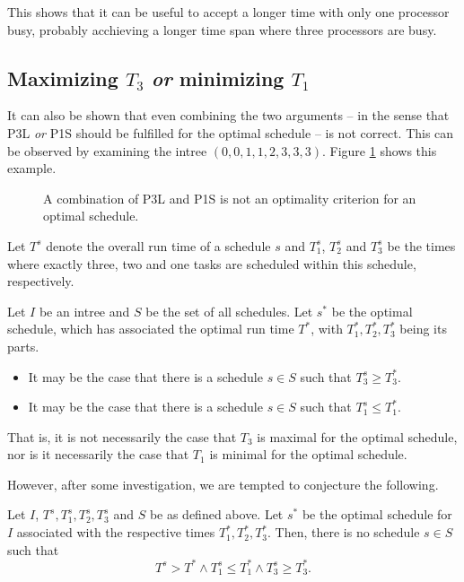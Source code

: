 This shows that it can be useful to accept a longer time with only one processor busy, probably acchieving a longer time span where three processors are busy.

\subsection{Maximizing $T_3$ \emph{or} minimizing $T_1$}
\label{sec:p3-suboptimality-maximizing-t3-and-minimizing-t1}

It can also be shown that even combining the two arguments -- in the sense that P3L \emph{or} P1S should be fulfilled for the optimal schedule -- is not correct. This can be observed by examining the intree $(0, 0, 1, 1, 2, 3, 3, 3)$. Figure \ref{fig:p3l-p1s-combo-suboptimal} shows this example.

\begin{figure}[ht]
  \centering
  
  \caption{A combination of P3L and P1S is not an optimality criterion for an optimal schedule.}
  \label{fig:p3l-p1s-combo-suboptimal}
\end{figure}

\begin{corollary}
  Let $T^s$ denote the overall run time of a schedule $s$ and $T_1^s$, $T_2^s$ and $T_3^s$ be the times where exactly three, two and one tasks are scheduled within this schedule, respectively.

  Let $I$ be an intree and $S$ be the set of all schedules. Let $s^*$ be the optimal schedule, which has associated the optimal run time $T^*$, with $T_1^*, T_2^*, T_3^*$ being its parts.
  \begin{itemize}
  \item It may be the case that there is a schedule $s\in S$ such that $T_3^s \geq T_3^*$.
  \item It may be the case that there is a schedule $s\in S$ such that $T_1^s \leq T_1^*$.
  \end{itemize}
\end{corollary}

That is, it is not necessarily the case that $T_3$ is maximal for the optimal schedule, nor is it necessarily the case that $T_1$ is minimal for the optimal schedule.

However, after some investigation, we are tempted to conjecture the following.

\begin{conjecture}
  Let $I$, $T^s, T_1^s, T_2^s, T_3^s$ and $S$ be as defined above. Let $s^*$ be the optimal schedule for $I$ associated with the respective times $T_1^*, T_2^*, T_3^*$. Then, there is no schedule $s\in S$ such that
  \begin{equation*}
    T^s > T^* \wedge T_1^s \leq T_1^* \wedge T_3^s \geq T_3^*.
  \end{equation*}
\end{conjecture}

